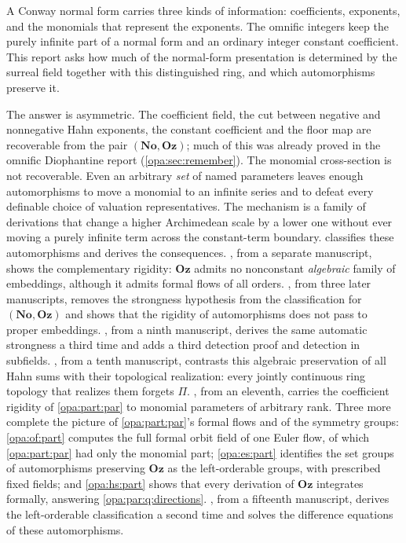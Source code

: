 \documentclass[11pt,oneside]{article}
\numberwithin{equation}{section}
\theoremstyle{definition}
\theoremstyle{remark}
\newcommand{\No}{\mathbf{No}}
\newcommand{\Oz}{\mathbf{Oz}}
\begin{document}
A Conway normal form carries three kinds of information: coefficients,
exponents, and the monomials that represent the exponents. The omnific
integers keep the purely infinite part of a normal form and an ordinary
integer constant coefficient. This report asks how much of the normal-form
presentation is determined by the surreal field together with this
distinguished ring, and which automorphisms preserve it.

The answer is asymmetric. The coefficient field, the cut between negative
and nonnegative Hahn exponents, the constant coefficient and the floor map
are recoverable from the pair $(\No,\Oz)$; much of this was already proved in
the omnific Diophantine report (\cref{opa:sec:remember}). The monomial
cross-section is not recoverable. Even an arbitrary \emph{set} of named
parameters leaves enough automorphisms to move a monomial to an infinite
series and to defeat every definable choice of valuation representatives.
The mechanism is a family of derivations that change a higher Archimedean
scale by a lower one without ever moving a purely infinite term across the
constant-term boundary.  classifies these
automorphisms and derives the consequences. , from a
separate manuscript, shows the complementary rigidity: $\Oz$ admits no
nonconstant \emph{algebraic} family of embeddings, although it admits
formal flows of all orders. , from three later
manuscripts, removes the strongness hypothesis from the classification for
$(\No,\Oz)$ and shows that the rigidity of automorphisms does not pass to
proper embeddings. , from a ninth manuscript, derives the
same automatic strongness a third time and adds a third detection proof and
detection in subfields. , from a tenth manuscript, contrasts
this algebraic preservation of all Hahn sums with their topological
realization: every jointly continuous ring topology that realizes them forgets
$\Pi$. , from an eleventh, carries the coefficient rigidity of
\cref{opa:part:par} to monomial parameters of arbitrary rank. Three more complete the
picture of \cref{opa:part:par}'s formal flows and of the symmetry groups:
\cref{opa:of:part} computes the full formal orbit field of one Euler flow, of which
\cref{opa:part:par} had only the monomial part; \cref{opa:es:part} identifies the set
groups of automorphisms preserving $\Oz$ as the left-orderable groups, with prescribed
fixed fields; and \cref{opa:hs:part} shows that every derivation of $\Oz$ integrates
formally, answering \cref{opa:par:q:directions}. , from a fifteenth
manuscript, derives the left-orderable classification a second time and solves the
difference equations of these automorphisms.
\end{document}
